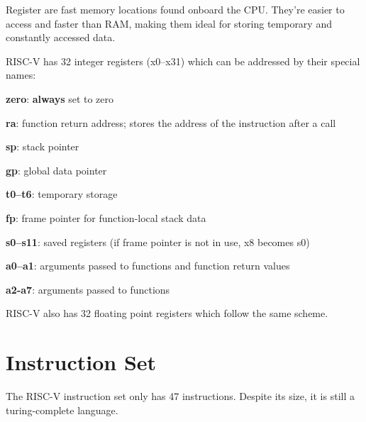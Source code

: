 \documentclass[12pt]{report}
\begin{document}
\begin{dfnbox}{Register}
	 are fast memory locations found onboard the CPU. They're easier to access and faster than RAM, making them ideal for storing temporary and constantly accessed data.
	
	RISC-V has 32 integer registers (x0--x31) which can be addressed by their special names:
	\begin{dfnitems}
		\item \textbf{zero}: \textbf{always} set to zero
		\item \textbf{ra}: function return address; stores the address of the instruction after a call
		\item \textbf{sp}: stack pointer
		\item \textbf{gp}: global data pointer
		\item \textbf{t0--t6}: temporary storage
		\item \textbf{fp}: frame pointer for function-local stack data
		\item \textbf{s0--s11}: saved registers (if frame pointer is not in use, x8 becomes s0)
		\item \textbf{a0--a1}: arguments passed to functions and function return values
		\item \textbf{a2-a7}: arguments passed to functions
	\end{dfnitems}

	RISC-V also has 32 floating point registers which follow the same scheme.
\end{dfnbox}

\section{Instruction Set}
The RISC-V instruction set only has 47 instructions. Despite its size, it is still a turing-complete language.
\end{document}
